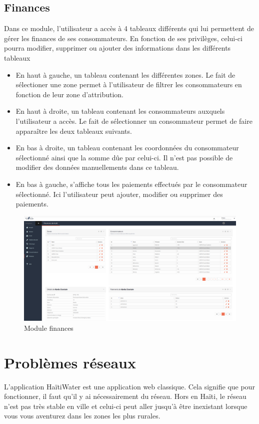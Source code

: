 \documentclass{EPL-master-thesis-covers-FR}
\begin{document}
			\subsection{Finances}
				Dans ce module, l'utilisateur a accès à 4 tableaux différents qui lui permettent de gérer les finances de ses consommateurs. En fonction de ses privilèges, celui-ci pourra modifier, supprimer ou ajouter des informations dans les différents tableaux
				\begin{itemize}
					\item En haut à gauche, un tableau contenant les différentes zones. Le fait de sélectioner une zone permet à l'utilisateur de filtrer les consommateurs en fonction de leur zone d'attribution.
					\item En haut à droite, un tableau contenant les consommateurs auxquels l'utilisateur a accès. Le fait de sélectionner un consommateur permet de faire apparaître les deux tableaux suivants.
					\item En bas à droite, un tableau contenant les coordonnées du consommateur sélectionné ainsi que la somme dûe par celui-ci. Il n'est pas possible de modifier des données manuellements dans ce tableau.
					\item En bas à gauche, s'affiche tous les paiements effectués par le consommateur sélectionné. Ici l'utilisateur peut ajouter, modifier ou supprimer des paiements.
				\end{itemize}
				
				\begin{figure}[H]
					\centering
					\includegraphics[width=1\textwidth]{images/finances}
					\caption{Module finances}
				\end{figure}
				
				
		\section{Problèmes réseaux}
			L'application HaïtiWater est une application web classique. Cela signifie que pour fonctionner, il faut qu'il y ai nécessairement du réseau. Hors en Haïti, le réseau n'est pas très stable en ville et celui-ci peut aller jusqu'à être inexistant lorsque vous vous aventurez dans les zones les plus rurales. 
			
\end{document}
